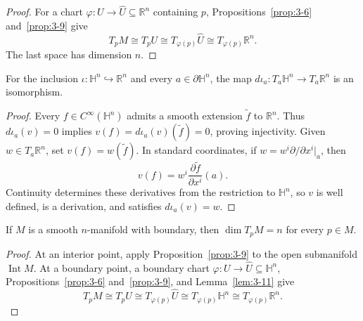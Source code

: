 \begin{proof}

\sketch
For a chart $\varphi:U\to\widehat U\subseteq\mathbb{R}^n$ containing $p$,
Propositions~\ref{prop:3-6} and~\ref{prop:3-9} give
\[
T_pM\cong T_pU\cong T_{\varphi(p)}\widehat U
\cong T_{\varphi(p)}\mathbb{R}^n.
\]
The last space has dimension $n$.
\end{proof}

\begin{lemma}
\label{lem:3-11}




For the inclusion $\iota:\mathbb{H}^n\hookrightarrow\mathbb{R}^n$ and every
$a\in\partial\mathbb{H}^n$, the map
$d\iota_a:T_a\mathbb{H}^n\to T_a\mathbb{R}^n$ is an isomorphism.
\end{lemma}

\begin{proof}

\sketch
Every $f\in C^\infty(\mathbb{H}^n)$ admits a smooth extension
$\widetilde f$ to $\mathbb{R}^n$. Thus $d\iota_a(v)=0$ implies
$v(f)=d\iota_a(v)(\widetilde f)=0$, proving injectivity. Given
$w\in T_a\mathbb{R}^n$, set $v(f)=w(\widetilde f)$. In standard coordinates,
if $w=w^i\partial/\partial x^i|_a$, then
\[
v(f)=w^i\frac{\partial\widetilde f}{\partial x^i}(a).
\]
Continuity determines these derivatives from the restriction to
$\mathbb{H}^n$, so $v$ is well defined, is a derivation, and satisfies
$d\iota_a(v)=w$.
\end{proof}

\begin{proposition}
\label{prop:3-12}





If $M$ is a smooth $n$-manifold with boundary, then $\dim T_pM=n$ for every
$p\in M$.
\end{proposition}

\begin{proof}

\sketch
At an interior point, apply Proposition~\ref{prop:3-9} to the open submanifold
$\operatorname{Int}M$. At a boundary point, a boundary chart
$\varphi:U\to\widehat U\subseteq\mathbb{H}^n$,
Propositions~\ref{prop:3-6} and~\ref{prop:3-9}, and
Lemma~\ref{lem:3-11} give
\[
T_pM\cong T_pU\cong T_{\varphi(p)}\widehat U
\cong T_{\varphi(p)}\mathbb{H}^n
\cong T_{\varphi(p)}\mathbb{R}^n.
\]
\end{proof}

